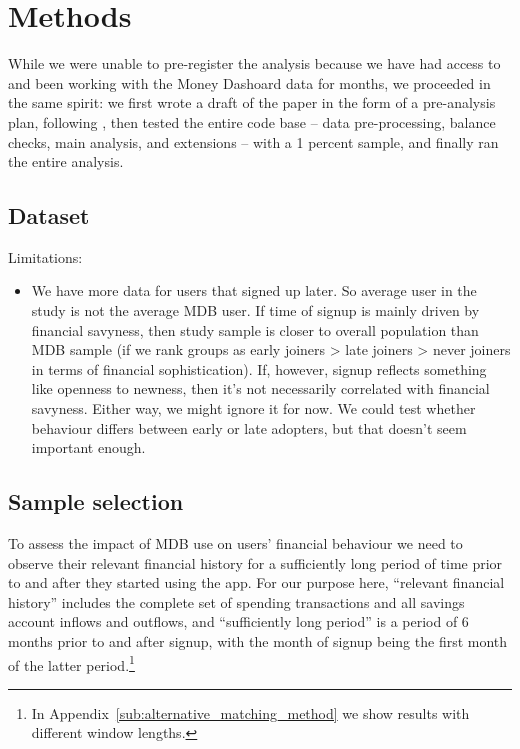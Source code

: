 
\section{Methods}%
\label{sec:data}

While we were unable to pre-register the analysis because we have had access to
and been working with the Money Dashoard data for months, we proceeded in the
same spirit: we first wrote a draft of the paper in the form of a pre-analysis
plan, following \citet{olken2015promises}, then tested the entire code base --
data pre-processing, balance checks, main analysis, and extensions -- with a 1
percent sample, and finally ran the entire analysis.


\subsection{Dataset}%
\label{sub:dataset}

Limitations:
\begin{itemize}
    \item We have more data for users that signed up later. So average user in
        the study is not the average MDB user. If time of signup is mainly
        driven by financial savyness, then study sample is closer to overall
        population than MDB sample (if we rank groups as early joiners > late
        joiners > never joiners in terms of financial sophistication). If,
        however, signup reflects something like openness to newness, then it's
        not necessarily correlated with financial savyness. Either way, we
        might ignore it for now. We could test whether behaviour differs
        between early or late adopters, but that doesn't seem important enough.
\end{itemize}


\subsection{Sample selection}%
\label{sub:sample_selection}

To assess the impact of MDB use on users' financial behaviour we need to
observe their relevant financial history for a sufficiently long period of time
prior to and after they started using the app. For our purpose here, ``relevant
financial history'' includes the complete set of spending transactions and all
savings account inflows and outflows, and ``sufficiently long period'' is a
period of 6 months prior to and after signup, with the month of signup being
the first month of the latter period.\footnote{In
Appendix~\ref{sub:alternative_matching_method} we show results with different
window lengths. }

